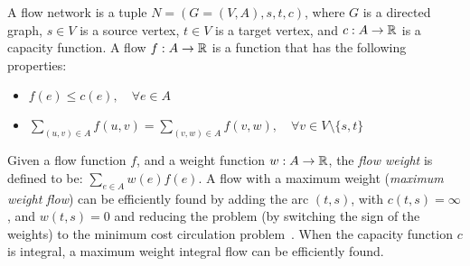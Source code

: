 \label{sec:carpool:preliminary}
A flow network is a tuple $N = (G = (V, A), s, t, c)$, 
where $G$ is a directed graph, 
$s \in V$ is a source vertex, 
$t \in V$ is a target vertex, 
and $c : A \rightarrow \mathbb{R}$ is a capacity function. 
A flow $f : A \rightarrow \mathbb{R}$ is a function that has the following properties:
\begin{itemize}
\item
$f(e) \leq c(e), \quad \forall e \in A$

\item
$\sum_{(u, v) \in A} f(u, v) = \sum_{(v, w) \in A} f(v, w), \quad \forall v \in V \setminus \{s, t\}$
\end{itemize}

Given a flow function $f$, 
and a weight function $w: A \rightarrow \mathbb{R}$, 
the \emph{flow weight} is defined to be:
$\sum_{e \in A}{w(e)f(e)}$.
A flow with a maximum weight (\emph{maximum weight flow}) can be efficiently found by adding 
the arc $(t, s)$, with $c(t,s) = \infty$, and $w(t,s) = 0$ and reducing the problem
(by switching the sign of the weights) 
to the minimum cost circulation problem~\cite{tardos1985strongly}.
When the capacity function $c$ is integral, 
a maximum weight integral flow can be efficiently found.  

